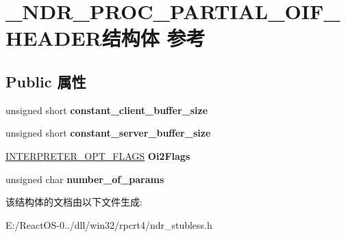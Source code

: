 \hypertarget{struct___n_d_r___p_r_o_c___p_a_r_t_i_a_l___o_i_f___h_e_a_d_e_r}{}\section{\+\_\+\+N\+D\+R\+\_\+\+P\+R\+O\+C\+\_\+\+P\+A\+R\+T\+I\+A\+L\+\_\+\+O\+I\+F\+\_\+\+H\+E\+A\+D\+E\+R结构体 参考}
\label{struct___n_d_r___p_r_o_c___p_a_r_t_i_a_l___o_i_f___h_e_a_d_e_r}
\subsection*{Public 属性}
\begin{DoxyCompactItemize}
\item 
\mbox{\label{struct___n_d_r___p_r_o_c___p_a_r_t_i_a_l___o_i_f___h_e_a_d_e_r_a006c9b43fd9f973d7453525f0b5415f5}} 
unsigned short {\bfseries constant\+\_\+client\+\_\+buffer\+\_\+size}
\item 
\mbox{\label{struct___n_d_r___p_r_o_c___p_a_r_t_i_a_l___o_i_f___h_e_a_d_e_r_aebf556dd4f60b603a03ccf44b0287f5f}} 
unsigned short {\bfseries constant\+\_\+server\+\_\+buffer\+\_\+size}
\item 
\mbox{\label{struct___n_d_r___p_r_o_c___p_a_r_t_i_a_l___o_i_f___h_e_a_d_e_r_a5173d3b273c9c21573f427239c734ea2}} 
\hyperlink{struct_i_n_t_e_r_p_r_e_t_e_r___o_p_t___f_l_a_g_s}{I\+N\+T\+E\+R\+P\+R\+E\+T\+E\+R\+\_\+\+O\+P\+T\+\_\+\+F\+L\+A\+GS} {\bfseries Oi2\+Flags}
\item 
\mbox{\label{struct___n_d_r___p_r_o_c___p_a_r_t_i_a_l___o_i_f___h_e_a_d_e_r_ae5d25a9dfd2d085addf253fbe7df746f}} 
unsigned char {\bfseries number\+\_\+of\+\_\+params}
\end{DoxyCompactItemize}


该结构体的文档由以下文件生成\+:\begin{DoxyCompactItemize}
\item 
E\+:/\+React\+O\+S-\/0../dll/win32/rpcrt4/ndr\+\_\+stubless.\+h\end{DoxyCompactItemize}
